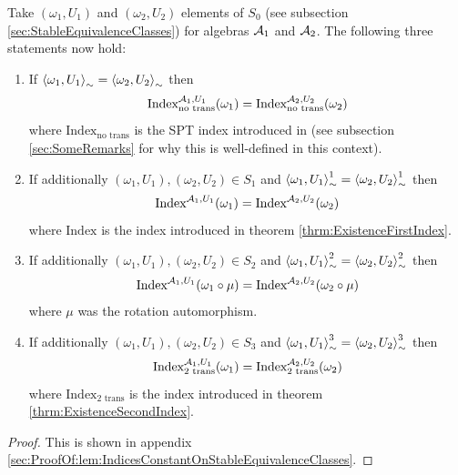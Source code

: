 \documentclass[11pt,a4paper,twoside]{article}
\numberwithin{equation}{section}
\begin{document}
	\begin{lemma}\label{lem:IndicesConstantOnStableEquivalenceClasses}
		Take $(\omega_1,U_1)$ and $(\omega_2,U_2)$ elements of $S_0$ (see subsection \ref{sec:StableEquivalenceClasses}) for algebras $\AA_1$ and $\AA_2$. The following three statements now hold:
		\begin{enumerate}
			\item If $\expval{\omega_1,U_1}_\sim=\expval{\omega_2,U_2}_\sim$ then
			\begin{equation}
				\textrm{Index}^{\AA_1,U_1}_{\text{no trans}}(\omega_1)=\textrm{Index}^{\AA_2,U_2}_{\text{no trans}}(\omega_2)
			\end{equation}
			where $\textrm{Index}_{\text{no trans}}$ is the SPT index introduced in \cite{ogata2021h3gmathbb} (see subsection \ref{sec:SomeRemarks} for why this is well-defined in this context).
			\item If additionally $(\omega_1,U_1),(\omega_2,U_2)\in S_1$ and $\expval{\omega_1,U_1}_\sim^1=\expval{\omega_2,U_2}_\sim^1$ then
			\begin{equation}
				\textrm{Index}^{\AA_1,U_1}(\omega_1)=\textrm{Index}^{\AA_2,U_2}(\omega_2)
			\end{equation}
			where $\textrm{Index}$ is the index introduced in theorem \ref{thrm:ExistenceFirstIndex}.
			\item If additionally $(\omega_1,U_1),(\omega_2,U_2)\in S_2$ and $\expval{\omega_1,U_1}_\sim^2=\expval{\omega_2,U_2}_\sim^2$ then
			\begin{equation}
				\textrm{Index}^{\AA_1,U_1}(\omega_1\circ\mu)=\textrm{Index}^{\AA_2,U_2}(\omega_2\circ\mu)
			\end{equation}
			where $\mu$ was the rotation automorphism.
			\item If additionally $(\omega_1,U_1),(\omega_2,U_2)\in S_3$ and $\expval{\omega_1,U_1}_\sim^3=\expval{\omega_2,U_2}_\sim^3$ then
			\begin{equation}
				\textrm{Index}^{\AA_1,U_1}_{\text{2 trans}}(\omega_1)=\textrm{Index}^{\AA_2,U_2}_{\text{2 trans}}(\omega_2)
			\end{equation}
			where $\textrm{Index}_{\text{2 trans}}$ is the index introduced in theorem \ref{thrm:ExistenceSecondIndex}.
		\end{enumerate}
	\end{lemma}
	\begin{proof}
		This is shown in appendix \ref{sec:ProofOf:lem:IndicesConstantOnStableEquivalenceClasses}.
	\end{proof}
\end{document}

